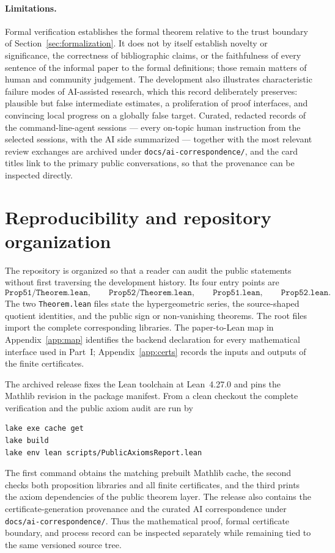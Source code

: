 \documentclass[11pt]{article}
\theoremstyle{definition}
\theoremstyle{remark}
\newcommand{\code}[1]{\texttt{#1}}
\begin{document}
\paragraph{Limitations.}
Formal verification establishes the formal theorem relative to the trust boundary
of Section~\ref{sec:formalization}.  It does not by itself establish novelty or
significance, the correctness of bibliographic claims, or the faithfulness of
every sentence of the informal paper to the formal definitions; those remain
matters of human and community judgement.  The development also illustrates
characteristic failure modes of AI-assisted research, which this record
deliberately preserves: plausible but false intermediate estimates, a
proliferation of proof interfaces, and convincing local progress on a globally
false target.  Curated, redacted records of the command-line-agent sessions ---
every on-topic human instruction from the selected sessions, with the AI side
summarized --- together with the most relevant review exchanges are archived
under \code{docs/ai-correspondence/},
and the card titles link to the primary public conversations, so that the
provenance can be inspected directly.

\section{Reproducibility and repository organization}\label{sec:repro}

The repository is organized so that a reader can audit the public statements
without first traversing the development history.  Its four entry points are
\[
  \code{Prop51/Theorem.lean},\qquad \code{Prop52/Theorem.lean},\qquad
  \code{Prop51.lean},\qquad \code{Prop52.lean}.
\]
The two \code{Theorem.lean} files state the hypergeometric series, the
source-shaped quotient identities, and the public sign or non-vanishing
theorems.  The root files import the complete corresponding libraries.  The
paper-to-Lean map in Appendix~\ref{app:map} identifies the backend declaration
for every mathematical interface used in Part~I; Appendix~\ref{app:certs}
records the inputs and outputs of the finite certificates.

The archived release fixes the Lean toolchain at Lean~4.27.0 and pins the
Mathlib revision in the package manifest.  From a clean checkout the complete
verification and the public axiom audit are run by
\begin{lstlisting}
lake exe cache get
lake build
lake env lean scripts/PublicAxiomsReport.lean
\end{lstlisting}
The first command obtains the matching prebuilt Mathlib cache, the second
checks both proposition libraries and all finite certificates, and the third
prints the axiom dependencies of the public theorem layer.  The release also
contains the certificate-generation provenance and the curated AI
correspondence under \code{docs/ai-correspondence/}.  Thus the mathematical
proof, formal certificate boundary, and process record can be inspected
separately while remaining tied to the same versioned source tree.
\end{document}
